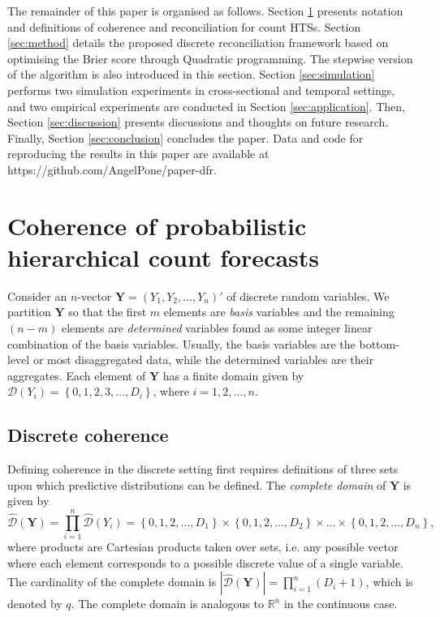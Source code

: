\documentclass[a4paper,review,11pt,authoryear]{elsarticle}
\newcommand{\bY}{\mathbf{Y}}
\theoremstyle{definition}
\begin{document}
The remainder of this paper is organised as follows.
Section \ref{sec:coherence} presents notation and definitions of coherence and reconciliation for count HTSs.
Section \ref{sec:method} details the proposed discrete reconciliation framework based on optimising the Brier score through Quadratic programming. The stepwise version of the algorithm is also introduced in this section.
Section \ref{sec:simulation} performs two simulation experiments in cross-sectional and temporal settings, and two empirical experiments are conducted in Section \ref{sec:application}.
Then, Section \ref{sec:discussion} presents discussions and thoughts on future research. 
Finally, Section \ref{sec:conclusion} concludes the paper.
Data and code for reproducing the results in this paper are available at https://github.com/AngelPone/paper-dfr.



\section{Coherence of probabilistic hierarchical count forecasts}

\label{sec:coherence}


Consider an $n$-vector $\bY=\left(Y_1,Y_2,\ldots,Y_n\right)'$ of discrete random variables.
We partition $\bY$ so that the first $m$ elements are \textit{basis} variables and the remaining $(n-m)$ elements are \textit{determined} variables found as some integer linear combination of the basis variables. Usually, the basis variables are the bottom-level or most disaggregated data, while the determined variables are their aggregates.
Each element of $\bY$ has a finite domain given by $\mathcal{D}(Y_i)=\left\{0, 1,2,3,\dots,D_i\right\}$, where $i = 1, 2, \dots, n$.

\subsection{Discrete coherence}\label{sec:domains}

Defining coherence in the discrete setting first requires definitions of three sets upon which predictive distributions can be defined. The \textit{complete domain} of $\bY$ is given by
\[
\hat{\mathcal D}(\bY)=\prod\limits_{i=1}^n\hat{\mathcal D}(Y_i)=\left\{0, 1,2,\dots,D_1\right\}\times\left\{0,1,2,\dots,D_2\right\}\times\dots\times\left\{0,1,2,\dots,D_n\right\},
\]
where products are Cartesian products taken over sets, i.e. any possible vector where each element corresponds to a possible discrete value of a single variable.
The cardinality of the complete domain is $|\hat{\mathcal D}(\bY)|=\prod\limits_{i=1}^{n} (D_i+1)$, which is denoted by $q$.
The complete domain is analogous to $\mathbb{R}^n$ in the continuous case.
\end{document}
